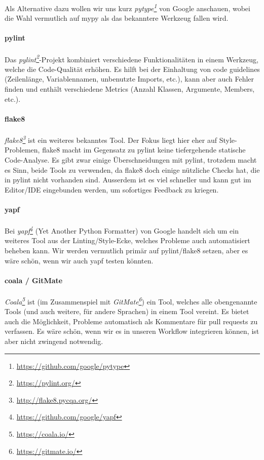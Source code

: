 \documentclass[a4paper]{article}
\newcommand{\tool}[2]{\emph{#1\footnote{\url{#2}}}}
\begin{document}
Als Alternative dazu wollen wir uns kurz
\tool{pytype}{https://github.com/google/pytype} von Google
anschauen, wobei die Wahl vermutlich auf mypy als das bekanntere Werkzeug fallen wird.

\paragraph{pylint} Das \tool{pylint}{https://pylint.org/}-Projekt
kombiniert verschiedene Funktionalitäten in einem Werkzeug, welche die
Code-Qualität erhöhen. Es hilft bei der Einhaltung von code guidelines
(Zeilenlänge, Variablennamen, unbenutzte Imports, etc.), kann aber auch Fehler
finden und enthält verschiedene Metrics (Anzahl Klassen, Argumente, Members, etc.).

\paragraph{flake8} \tool{flake8}{http://flake8.pycqa.org/} ist
ein weiteres bekanntes Tool. Der Fokus liegt hier eher auf Style-Problemen,
flake8 macht im Gegensatz zu pylint keine tiefergehende statische Code-Analyse.
Es gibt zwar einige Überschneidungen mit pylint, trotzdem macht es Sinn, beide
Tools zu verwenden, da flake8 doch einige nützliche Checks hat, die in pylint
nicht vorhanden sind. Ausserdem ist es viel schneller und kann gut im Editor/IDE
eingebunden werden, um sofortiges Feedback zu kriegen.

\paragraph{yapf} Bei \tool{yapf}{https://github.com/google/yapf}
(Yet Another Python Formatter) von Google handelt sich um ein weiteres Tool aus
der Linting/Style-Ecke, welches Probleme auch automatisiert beheben kann. Wir
werden vermutlich primär auf pylint/flake8 setzen, aber es wäre schön, wenn wir
auch yapf testen könnten.

\paragraph{coala / GitMate} \tool{Coala}{https://coala.io/} ist
(im Zusammenspiel mit \tool{GitMate}{https://gitmate.io/}) ein
Tool, welches alle obengenannte Tools (und auch weitere, für andere Sprachen) in
einem Tool vereint. Es bietet auch die Möglichkeit, Probleme automatisch als
Kommentare für pull requests zu verfassen. Es wäre schön, wenn wir es in unseren
Workflow integrieren können, ist aber nicht zwingend notwendig.
\end{document}
